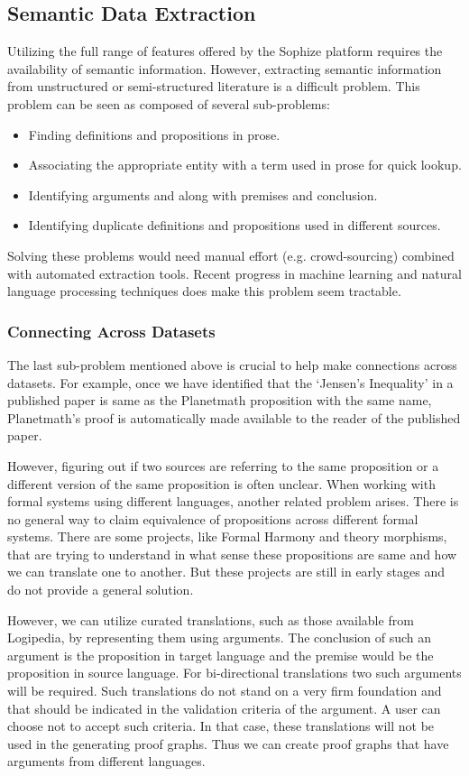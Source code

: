 \documentclass[runningheads]{llncs}
\begin{document}
\subsection{Semantic Data Extraction}
Utilizing the full range of features offered by the Sophize platform requires the availability of semantic information. However, extracting semantic information from unstructured or semi-structured literature is a difficult problem. This problem can be seen as composed of several sub-problems:
\begin{itemize}
\item Finding definitions and propositions in prose.
\item Associating the appropriate entity with a term used in prose for quick lookup.
\item Identifying arguments and along with premises and conclusion.
\item \label{prob:dup} Identifying duplicate definitions and propositions used in different sources.
\end{itemize}

Solving these problems would need manual effort (e.g. crowd-sourcing) combined with automated extraction tools. Recent progress in machine learning and natural language processing techniques does make this problem seem tractable.

\subsubsection{Connecting Across Datasets}
The last sub-problem mentioned above is crucial to help make connections across datasets. For example, once we have identified that the `Jensen's Inequality' in a published paper is same as the Planetmath proposition with the same name, Planetmath's proof is automatically made available to the reader of the published paper.

However, figuring out if two sources are referring to the same proposition or a different version of the same proposition is often unclear. When working with formal systems using different languages, another related problem arises. There is no general way to claim equivalence of propositions across different formal systems. There are some projects, like Formal Harmony and theory morphisms, that are trying to understand in what sense these propositions are same and how we can translate one to another. But these projects are still in early stages and do not provide a general solution.

However, we can utilize curated translations, such as those available from Logipedia, by representing them using arguments. The conclusion of such an argument is the proposition in target language and the premise would be the proposition in source language. For bi-directional translations two such arguments will be required. Such translations do not stand on a very firm foundation and that should be indicated in the validation criteria of the argument. A user can choose not to accept such criteria. In that case, these translations will not be used in the generating proof graphs. Thus we can create proof graphs that have arguments from different languages.
\end{document}
